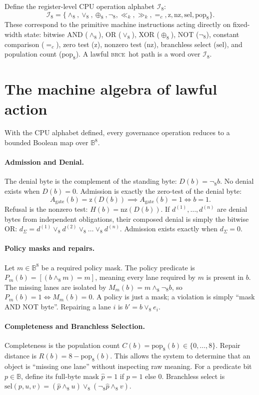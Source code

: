 \documentclass[11pt,oneside]{book}
\theoremstyle{definition}
\theoremstyle{plain}
\theoremstyle{remark}
\newcommand{\BRCE}{\textsc{brce}}
\begin{document}
Define the register-level CPU operation alphabet $\mathcal{I}_8$:
\[
\mathcal{I}_8 = \{ \wedge_8, \vee_8, \oplus_8, \neg_8, \ll_k, \gg_k, =_c, \text{z}, \text{nz}, \text{sel}, \text{pop}_8 \}.
\]
These correspond to the primitive machine instructions acting directly on fixed-width state: bitwise AND ($\wedge_8$), OR ($\vee_8$), XOR ($\oplus_8$), NOT ($\neg_8$), constant comparison ($=_c$), zero test ($\text{z}$), nonzero test ($\text{nz}$), branchless select ($\text{sel}$), and population count ($\text{pop}_8$). A lawful \BRCE\ hot path is a word over $\mathcal{I}_8$.

\section{The machine algebra of lawful action}

With the CPU alphabet defined, every governance operation reduces to a bounded Boolean map over $\mathbb{B}^8$.

\paragraph{Admission and Denial.}
The denial byte is the complement of the standing byte: $D(b) = \neg_8 b$. No denial exists when $D(b) = 0$. Admission is exactly the zero-test of the denial byte:
\[
A_{\text{gate}}(b) = \text{z}(D(b)) \implies A_{\text{gate}}(b) = 1 \iff b = 1.
\]
Refusal is the nonzero test: $H(b) = \text{nz}(D(b))$. If $d^{(1)}, \dots, d^{(n)}$ are denial bytes from independent obligations, their composed denial is simply the bitwise OR: $d_\Sigma = d^{(1)} \vee_8 d^{(2)} \vee_8 \dots \vee_8 d^{(n)}$. Admission exists exactly when $d_\Sigma = 0$.

\paragraph{Policy masks and repairs.}
Let $m \in \mathbb{B}^8$ be a required policy mask. The policy predicate is $P_m(b) = [ (b \wedge_8 m) = m ]$, meaning every lane required by $m$ is present in $b$. The missing lanes are isolated by $M_m(b) = m \wedge_8 \neg_8 b$, so $P_m(b) = 1 \iff M_m(b) = 0$.
A policy is just a mask; a violation is simply ``mask AND NOT byte''. Repairing a lane $i$ is $b' = b \vee_8 e_i$.

\paragraph{Completeness and Branchless Selection.}
Completeness is the population count $C(b) = \text{pop}_8(b) \in \{0, \dots, 8\}$. Repair distance is $R(b) = 8 - \text{pop}_8(b)$. This allows the system to determine that an object is ``missing one lane'' without inspecting raw meaning.
For a predicate bit $p \in \mathbb{B}$, define its full-byte mask $\hat{p} = 1$ if $p=1$ else $0$. Branchless select is $\text{sel}(p, u, v) = (\hat{p} \wedge_8 u) \vee_8 (\neg_8 \hat{p} \wedge_8 v)$.
\end{document}
